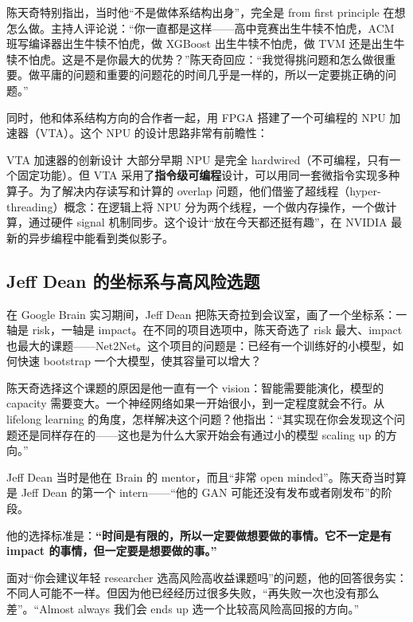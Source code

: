 \documentclass[a4paper]{article}
\begin{document}
陈天奇特别指出，当时他``不是做体系结构出身''，完全是 from first principle 在想怎么做。主持人评论说：``你一直都是这样------高中竞赛出生牛犊不怕虎，ACM 班写编译器出生牛犊不怕虎，做 XGBoost 出生牛犊不怕虎，做 TVM 还是出生牛犊不怕虎。这是不是你最大的优势？''陈天奇回应：``我觉得挑问题和怎么做很重要。做平庸的问题和重要的问题花的时间几乎是一样的，所以一定要挑正确的问题。''

同时，他和体系结构方向的合作者一起，用 FPGA 搭建了一个可编程的 NPU 加速器（VTA）。这个 NPU 的设计思路非常有前瞻性：

\begin{knowledgebox}{VTA 加速器的创新设计}
大部分早期 NPU 是完全 hardwired（不可编程，只有一个固定功能）。但 VTA 采用了\textbf{指令级可编程}设计，可以用同一套微指令实现多种算子。为了解决内存读写和计算的 overlap 问题，他们借鉴了超线程（hyper-threading）概念：在逻辑上将 NPU 分为两个线程，一个做内存操作，一个做计算，通过硬件 signal 机制同步。这个设计``放在今天都还挺有趣''，在 NVIDIA 最新的异步编程中能看到类似影子。
\end{knowledgebox}

\subsection{Jeff Dean 的坐标系与高风险选题}

在 Google Brain 实习期间，Jeff Dean 把陈天奇拉到会议室，画了一个坐标系：一轴是 risk，一轴是 impact。在不同的项目选项中，陈天奇选了 risk 最大、impact 也最大的课题------Net2Net。这个项目的问题是：已经有一个训练好的小模型，如何快速 bootstrap 一个大模型，使其容量可以增大？

陈天奇选择这个课题的原因是他一直有一个 vision：智能需要能演化，模型的 capacity 需要变大。一个神经网络如果一开始很小，到一定程度就会不行。从 lifelong learning 的角度，怎样解决这个问题？他指出：``其实现在你会发现这个问题还是同样存在的------这也是为什么大家开始会有通过小的模型 scaling up 的方向。''

Jeff Dean 当时是他在 Brain 的 mentor，而且``非常 open minded''。陈天奇当时算是 Jeff Dean 的第一个 intern------``他的 GAN 可能还没有发布或者刚发布''的阶段。

他的选择标准是：\textbf{``时间是有限的，所以一定要做想要做的事情。它不一定是有 impact 的事情，但一定要是想要做的事。''}

面对``你会建议年轻 researcher 选高风险高收益课题吗''的问题，他的回答很务实：不同人可能不一样。但因为他已经经历过很多失败，``再失败一次也没有那么差''。``Almost always 我们会 ends up 选一个比较高风险高回报的方向。''
\end{document}
